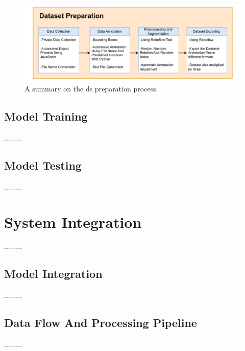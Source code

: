 \begin{figure}[!h]
    \centering
    \includegraphics[width=1\textwidth]{Figures/diagrams/DS_Prep.pdf}
    \caption{A summary on the \gls{ds} preparation process.}
    \label{DS_Prep}
\end{figure}

\subsection{Model Training}
.........
\subsection{Model Testing}
.........



\section{System Integration}
.........
\subsection{Model Integration}
.........
\subsection{Data Flow And Processing Pipeline}
.........

